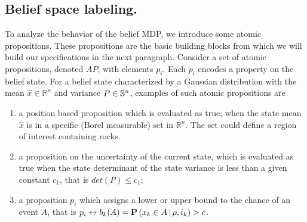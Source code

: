 \documentclass{ifacconf}
\renewcommand{\axx}[1]{{\color{orange} Ali: #1}}
\newcommand{\new}[1]{{\color{blue}#1}}
\begin{document}
	\subsection{Belief space labeling.}\label{sec:DTL}  
\new{To analyze the behavior of the belief MDP, we introduce some atomic propositions. These propositions are the basic building blocks from which we will build our specifications in the next paragraph.  Consider a set of atomic propositions, denoted $AP$, with elements $p_i$. Each $p_i$ encodes a property on the belief state.  }  
For a belief state characterized by  a Gaussian distribution with the mean $\hat x\in \mathbb R^n $ and variance $P\in\S^n$, examples of such atomic propositions are  
     \begin{enumerate}
         \item \new{a position based proposition which is evaluated as true, when the  state mean $\hat{x}$ is in a specific (Borel measurable) set  in $\mathbb R^n $. The set could define a region of interest containing rocks.}
 	\item \new{a proposition on the uncertainty of the current state, which is evaluated as true when the state determinant of the state variance is less than a given constant $c_1$, that is   $det(P)\leq c_1$; } %
	\item \new{ a proposition $ p_i$ which assigns a lower or upper bound to  the chance of an event $A$,  that is $ p_i \leftrightarrow b_k(A)=\po\left(x_k\in A{\,\mid\,}\rho, i_k\right)>c$. }
    \end{enumerate}
\end{document}
